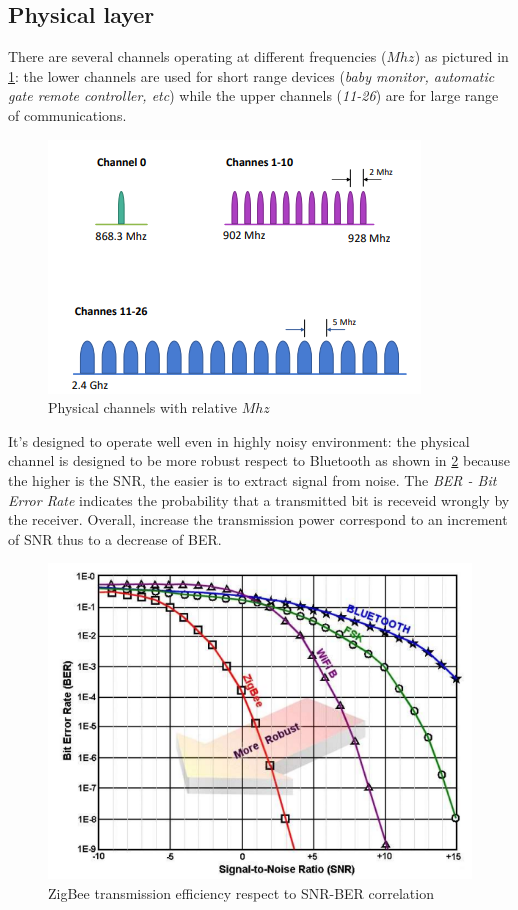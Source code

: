 \documentclass[10pt,a4paper]{report}
\theoremstyle{definition}
\begin{document}
\subsection{Physical layer}\label{sec:physical-layer}
There are several channels operating at different frequencies ($Mhz$) as pictured in \ref{phy-channels}: the lower channels are used for short range devices (\textit{baby monitor, automatic gate remote controller, etc}) while the upper channels (\textit{11-26}) are for large range of communications.
\begin{figure}[h]
	\centering\includegraphics[scale=0.50]{images/Pasted image 20230409093421.png}
	\caption{Physical channels with relative $Mhz$}
	\label{phy-channels}
\end{figure}


It's designed to operate well even in highly noisy environment: the physical channel is designed to be more robust respect to Bluetooth as shown in \ref{ieee-snr-ber} because the higher is the SNR, the easier is to extract signal from noise. The \textit{BER - Bit Error Rate} indicates the probability that a transmitted bit is receveid wrongly by the receiver. Overall, increase the transmission power correspond to an increment of SNR thus to a decrease of BER. 
\begin{figure}[h]
	\centering\includegraphics[scale=0.50]{images/Pasted image 20230409094546.png}
	\caption{ZigBee transmission efficiency respect to SNR-BER correlation}
	\label{ieee-snr-ber}
\end{figure}
\end{document}
